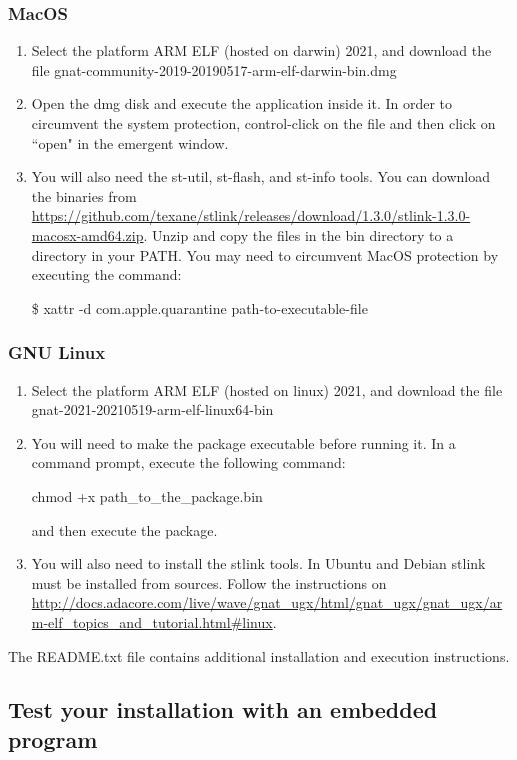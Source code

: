 \subsubsection*{MacOS}
\begin{enumerate}
\item Select the platform ARM ELF (hosted on darwin) 2021, and download the file gnat-community-2019-20190517-arm-elf-darwin-bin.dmg
\item Open the dmg disk and execute the application inside it. In order to circumvent the system protection, control-click on the file and then click on ``open" in the emergent window.
\item You will also need the st-util,  st-flash, and st-info tools. You can download the binaries from 
\url{https://github.com/texane/stlink/releases/download/1.3.0/stlink-1.3.0-macosx-amd64.zip}. Unzip and copy the files in the bin directory to a directory in your PATH. You may need to circumvent MacOS protection by executing the command:

	\$ xattr -d com.apple.quarantine path-to-executable-file
\end{enumerate}
\subsubsection*{GNU Linux}
\begin{enumerate}
\item Select the platform ARM ELF (hosted on linux) 2021, and download the file gnat-2021-20210519-arm-elf-linux64-bin
\item You will need to make the package executable before running it. In a command prompt, execute the following command:

     chmod +x path\_to\_the\_package.bin

and then execute the package.
\item You will also need to install the stlink tools. In Ubuntu and Debian stlink must be installed from sources. Follow the instructions on \url{http://docs.adacore.com/live/wave/gnat\_ugx/html/gnat\_ugx/gnat\_ugx/arm-elf\_topics\_and\_tutorial.html\#linux}.
\end{enumerate}

The README.txt file contains additional installation and execution instructions.

\subsection{Test your installation with an embedded program}

